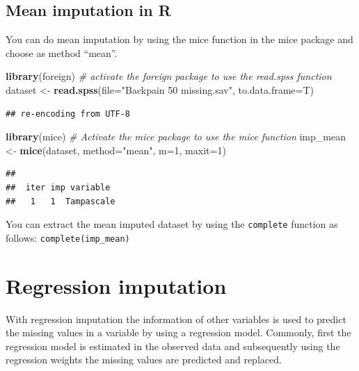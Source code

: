 \documentclass[
]{book}
\newenvironment{Shaded}{\begin{snugshade}}{\end{snugshade}}
\newcommand{\CommentTok}[1]{\textcolor[rgb]{0.56,0.35,0.01}{\textit{#1}}}
\newcommand{\DataTypeTok}[1]{\textcolor[rgb]{0.13,0.29,0.53}{#1}}
\newcommand{\DecValTok}[1]{\textcolor[rgb]{0.00,0.00,0.81}{#1}}
\newcommand{\KeywordTok}[1]{\textcolor[rgb]{0.13,0.29,0.53}{\textbf{#1}}}
\newcommand{\NormalTok}[1]{#1}
\newcommand{\StringTok}[1]{\textcolor[rgb]{0.31,0.60,0.02}{#1}}
\begin{document}
\hypertarget{mean-imputation-in-r}{%
\subsection{Mean imputation in R}\label{mean-imputation-in-r}}

You can do mean imputation by using the mice function in the mice package and choose as method ``mean''.

\begin{Shaded}
\begin{Highlighting}[]
\KeywordTok{library}\NormalTok{(foreign) }\CommentTok{# activate the foreign package to use the read.spss function}
\NormalTok{dataset <-}\StringTok{ }\KeywordTok{read.spss}\NormalTok{(}\DataTypeTok{file=}\StringTok{"Backpain 50 missing.sav"}\NormalTok{, }\DataTypeTok{to.data.frame=}\NormalTok{T)}
\end{Highlighting}
\end{Shaded}

\begin{verbatim}
## re-encoding from UTF-8
\end{verbatim}

\begin{Shaded}
\begin{Highlighting}[]
\KeywordTok{library}\NormalTok{(mice) }\CommentTok{# Activate the mice package to use the mice function}
\NormalTok{imp_mean <-}\StringTok{ }\KeywordTok{mice}\NormalTok{(dataset, }\DataTypeTok{method=}\StringTok{"mean"}\NormalTok{, }\DataTypeTok{m=}\DecValTok{1}\NormalTok{, }\DataTypeTok{maxit=}\DecValTok{1}\NormalTok{)}
\end{Highlighting}
\end{Shaded}

\begin{verbatim}
## 
##  iter imp variable
##   1   1  Tampascale
\end{verbatim}

You can extract the mean imputed dataset by using the \texttt{complete} function as follows: \texttt{complete(imp\_mean)}

\hypertarget{regression-imputation}{%
\section{Regression imputation}\label{regression-imputation}}

With regression imputation the information of other variables is used to predict the missing values in a variable by using a regression model. Commonly, first the regression model is estimated in the observed data and subsequently using the regression weights the missing values are predicted and replaced.
\end{document}
